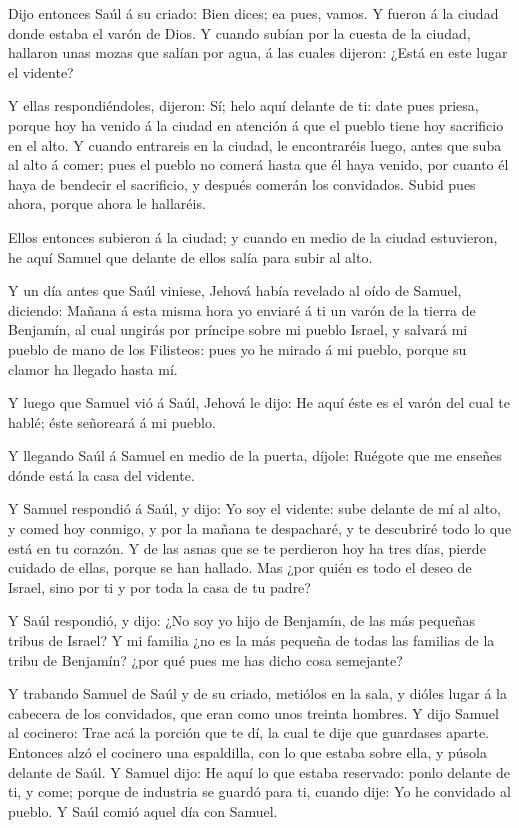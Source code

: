  Dijo entonces Saúl á su criado: Bien dices; ea pues,
vamos. Y fueron á la ciudad donde estaba el varón de Dios. 
Y cuando subían por la cuesta de la ciudad, hallaron unas mozas que
salían por agua, á las cuales dijeron: ¿Está en este lugar el vidente?

 Y ellas respondiéndoles, dijeron: Sí; helo aquí delante de
ti: date pues priesa, porque hoy ha venido á la ciudad en atención á que
el pueblo tiene hoy sacrificio en el alto.  Y cuando
entrareis en la ciudad, le encontraréis luego, antes que suba al alto á
comer; pues el pueblo no comerá hasta que él haya venido, por cuanto él
haya de bendecir el sacrificio, y después comerán los convidados. Subid
pues ahora, porque ahora le hallaréis.

 Ellos entonces subieron á la ciudad; y cuando en medio de
la ciudad estuvieron, he aquí Samuel que delante de ellos salía para
subir al alto.

 Y un día antes que Saúl viniese, Jehová había revelado al
oído de Samuel, diciendo:  Mañana á esta misma hora yo
enviaré á ti un varón de la tierra de Benjamín, al cual ungirás por
príncipe sobre mi pueblo Israel, y salvará mi pueblo de mano de los
Filisteos: pues yo he mirado á mi pueblo, porque su clamor ha llegado
hasta mí.

 Y luego que Samuel vió á Saúl, Jehová le dijo: He aquí
éste es el varón del cual te hablé; éste señoreará á mi pueblo.

 Y llegando Saúl á Samuel en medio de la puerta, díjole:
Ruégote que me enseñes dónde está la casa del vidente.

 Y Samuel respondió á Saúl, y dijo: Yo soy el vidente: sube
delante de mí al alto, y comed hoy conmigo, y por la mañana te
despacharé, y te descubriré todo lo que está en tu corazón.
 Y de las asnas que se te perdieron hoy ha tres días,
pierde cuidado de ellas, porque se han hallado. Mas ¿por quién es todo
el deseo de Israel, sino por ti y por toda la casa de tu padre?

 Y Saúl respondió, y dijo: ¿No soy yo hijo de Benjamín, de
las más pequeñas tribus de Israel? Y mi familia ¿no es la más pequeña de
todas las familias de la tribu de Benjamín? ¿por qué pues me has dicho
cosa semejante?

 Y trabando Samuel de Saúl y de su criado, metiólos en la
sala, y dióles lugar á la cabecera de los convidados, que eran como unos
treinta hombres.  Y dijo Samuel al cocinero: Trae acá la
porción que te dí, la cual te dije que guardases aparte. 
Entonces alzó el cocinero una espaldilla, con lo que estaba sobre ella,
y púsola delante de Saúl. Y Samuel dijo: He aquí lo que estaba
reservado: ponlo delante de ti, y come; porque de industria se guardó
para ti, cuando dije: Yo he convidado al pueblo. Y Saúl comió aquel día
con Samuel.

